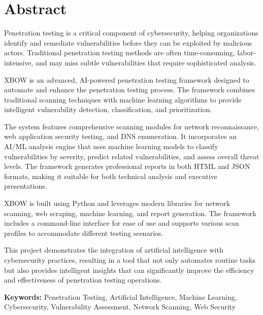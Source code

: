 \documentclass[12pt,a4paper]{report}
\begin{document}
\newpage

\chapter*{Abstract}
\thispagestyle{empty}

\begin{singlespace}
Penetration testing is a critical component of cybersecurity, helping organizations identify and remediate vulnerabilities before they can be exploited by malicious actors. Traditional penetration testing methods are often time-consuming, labor-intensive, and may miss subtle vulnerabilities that require sophisticated analysis.

XBOW is an advanced, AI-powered penetration testing framework designed to automate and enhance the penetration testing process. The framework combines traditional scanning techniques with machine learning algorithms to provide intelligent vulnerability detection, classification, and prioritization.

The system features comprehensive scanning modules for network reconnaissance, web application security testing, and DNS enumeration. It incorporates an AI/ML analysis engine that uses machine learning models to classify vulnerabilities by severity, predict related vulnerabilities, and assess overall threat levels. The framework generates professional reports in both HTML and JSON formats, making it suitable for both technical analysis and executive presentations.

XBOW is built using Python and leverages modern libraries for network scanning, web scraping, machine learning, and report generation. The framework includes a command-line interface for ease of use and supports various scan profiles to accommodate different testing scenarios.

This project demonstrates the integration of artificial intelligence with cybersecurity practices, resulting in a tool that not only automates routine tasks but also provides intelligent insights that can significantly improve the efficiency and effectiveness of penetration testing operations.

\textbf{Keywords:} Penetration Testing, Artificial Intelligence, Machine Learning, Cybersecurity, Vulnerability Assessment, Network Scanning, Web Security
\end{singlespace}

\newpage

\tableofcontents
\newpage
\end{document}
